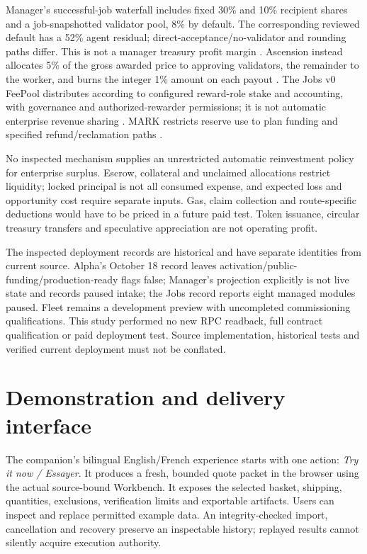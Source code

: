 Manager's successful-job waterfall includes fixed 30\% and 10\% recipient shares and a job-snapshotted validator pool, 8\% by default. The corresponding reviewed default has a 52\% agent residual; direct-acceptance/no-validator and rounding paths differ. This is not a manager treasury profit margin \cite{managercontract}. Ascension instead allocates 5\% of the gross awarded price to approving validators, the remainder to the worker, and burns the integer 1\% amount on each payout \cite{ascensioncontract}. The Jobs v0 FeePool distributes according to configured reward-role stake and accounting, with governance and authorized-rewarder permissions; it is not automatic enterprise revenue sharing \cite{feepoolcontract}. MARK restricts reserve use to plan funding and specified refund/reclamation paths \cite{markcontract}.

No inspected mechanism supplies an unrestricted automatic reinvestment policy for enterprise surplus. Escrow, collateral and unclaimed allocations restrict liquidity; locked principal is not all consumed expense, and expected loss and opportunity cost require separate inputs. Gas, claim collection and route-specific deductions would have to be priced in a future paid test. Token issuance, circular treasury transfers and speculative appreciation are not operating profit.

The inspected deployment records are historical and have separate identities from current source. Alpha's October 18 record leaves activation/public-funding/production-ready flags false; Manager's projection explicitly is not live state and records paused intake; the Jobs record reports eight managed modules paused. Fleet remains a development preview with uncompleted commissioning qualifications. This study performed no new RPC readback, full contract qualification or paid deployment test. Source implementation, historical tests and verified current deployment must not be conflated.

\section{Demonstration and delivery interface}

The companion's bilingual English/French experience starts with one action: \emph{Try it now / Essayer}. It produces a fresh, bounded quote packet in the browser using the actual source-bound Workbench. It exposes the selected basket, shipping, quantities, exclusions, verification limits and exportable artifacts. Users can inspect and replace permitted example data. An integrity-checked import, cancellation and recovery preserve an inspectable history; replayed results cannot silently acquire execution authority.

